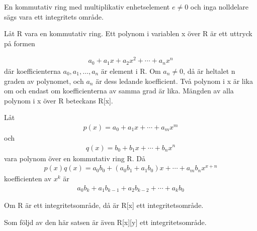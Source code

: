 \begin{definition}
 En kommutativ ring med multiplikativ enhetselement $e \neq 0$ och inga nolldelare sägs vara ett integritets område.
\end{definition}

\begin{definition}
Låt R vara en kommutativ ring. Ett polynom i variablen x över R är ett uttryck på formen 

\begin{align*}
 a_0+a_1x+a_2x^2+\cdots+a_nx^n
\end{align*}
där koefficienterna $a_0, a_1,\dots,a_n$ är element i R. Om $a_n \neq 0$, då är heltalet n graden av polynomet, och $a_n$ är dess ledande koefficient. Två polynom i x är lika om och endast om 
koefficienterna av samma grad är lika. Mängden av alla polynom i x över R beteckans R[x]. 

\end{definition}

\begin{definition}
 Låt
\begin{align*}
 p(x)=a_0+a_1x+\cdots+a_mx^m
\end{align*}
och
\begin{align*}
 q(x)=b_0+b_1x+\cdots+b_nx^n
\end{align*}
vara polynom över en kommutativ ring R. Då
\begin{align*}
 p(x)q(x)=a_0b_0+(a_0b_1+a_1b_0)x+\cdots+a_mb_nx^{x+n}
\end{align*}
koefficienten av $x^k$ är
\begin{align*}
 a_0b_k+a_1b_{k-1}+a_2b_{k-2}+\cdots+a_kb_0
\end{align*}

\end{definition}

\begin{theorem}
 Om R är ett integritetsområde, då är R[x] ett integritetsområde.
\end{theorem}

Som följd av den här satsen är även R[x][y] ett integritetsområde.
